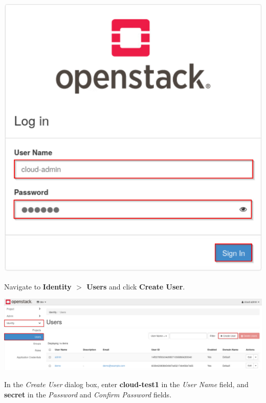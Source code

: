 \documentclass[letterpaper, 12pt]{article}
\begin{document}
\begin{enumerate}
\begin{labstep}
        \begin{center}
            \includegraphics[scale=0.5]{images/part3/step4.png}
        \end{center}
    \end{labstep}

    \begin{labstep}\label{it:create-user-start}
        Navigate to \textbf{Identity $>$ Users} and click \textbf{Create User}.

        \begin{center}
            \includegraphics[width=\linewidth]{images/part3/step5.png}
        \end{center}
    \end{labstep}

    \begin{labstep}
        In the \textit{Create User} dialog box, enter \textbf{cloud-test1} in the \textit{User Name} field, and \textbf{secret} in the \textit{Password} and \textit{Confirm Password} fields.


\end{labstep}
\end{enumerate}
\end{document}
